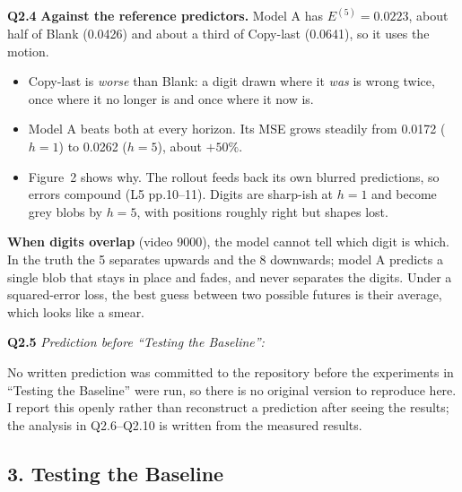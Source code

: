 \documentclass[11pt]{article}
\newcommand{\q}[1]{\par\medskip\noindent\textbf{#1}\quad}
\begin{document}
\q{Q2.4}
\textbf{Against the reference predictors.} Model A has $E^{(5)}=0.0223$, about half of Blank (0.0426) and about a third of Copy-last (0.0641), so it uses the motion.
\begin{itemize}
  \item Copy-last is \emph{worse} than Blank: a digit drawn where it \emph{was} is wrong twice, once where it no longer is and once where it now is.
  \item Model A beats both at every horizon. Its MSE grows steadily from 0.0172 ($h=1$) to 0.0262 ($h=5$), about $+50\%$.
  \item Figure~2 shows why. The rollout feeds back its own blurred predictions, so errors compound (L5 pp.10--11). Digits are sharp-ish at $h=1$ and become grey blobs by $h=5$, with positions roughly right but shapes lost.
\end{itemize}
\textbf{When digits overlap} (video 9000), the model cannot tell which digit is which. In the truth the 5 separates upwards and the 8 downwards; model A predicts a single blob that stays in place and fades, and never separates the digits. Under a squared-error loss, the best guess between two possible futures is their average, which looks like a smear.

\q{Q2.5} \emph{Prediction before ``Testing the Baseline'':}

No written prediction was committed to the repository before the experiments in ``Testing the Baseline'' were run, so there is no original version to reproduce here. I report this openly rather than reconstruct a prediction after seeing the results; the analysis in Q2.6--Q2.10 is written from the measured results.

\subsection*{3. Testing the Baseline}

\begin{table}[H]
\centering\small
\caption{Mirror ($M$) and rotation ($R$): consistency gap $C_T$ and transformed error $E_T$ ($1\times$, $t=1$, test split).}
\end{table}
\end{document}
